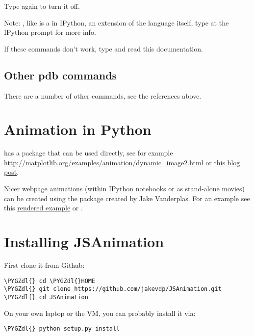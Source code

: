 \documentclass[letterpaper,10pt,english]{sphinxmanual}
\def\PYGZdl{\char`\$}
\begin{document}
Type  again to turn it off.

Note: , like  is a  in IPython, an extension of
the language itself, type  at the IPython prompt for more info.

If these commands don't work, type  and read this documentation.


\subsection{Other pdb commands}
\label{python_debugging:other-pdb-commands}
There are a number of other commands, see the references above.


\section{Animation in Python}
\label{animation:animation}\label{animation::doc}\label{animation:animation-in-python}
 has a package  that can be used directly,
see for example
\url{http://matplotlib.org/examples/animation/dynamic\_image2.html}
or \href{http://jakevdp.github.io/blog/2012/08/18/matplotlib-animation-tutorial/}{this blog post}.

Nicer webpage animations (within IPython notebooks or as stand-alone movies)
can be created using the package  created by
Jake Vanderplas.  For an example see this \href{http://nbviewer.ipython.org/github/jakevdp/JSAnimation/blob/master/animation\_example.ipynb}{rendered example}
or {\hyperref[labs/lab15:lab15]{}}.


\section{Installing JSAnimation}
\label{animation:installing-jsanimation}
First clone it from Github:

\begin{Verbatim}[commandchars=\\\{\}]
\PYGZdl{} cd \PYGZdl{}HOME
\PYGZdl{} git clone https://github.com/jakevdp/JSAnimation.git
\PYGZdl{} cd JSAnimation
\end{Verbatim}

On your own laptop or the VM, you can probably install it via:

\begin{Verbatim}[commandchars=\\\{\}]
\PYGZdl{} python setup.py install
\end{Verbatim}
\end{document}
